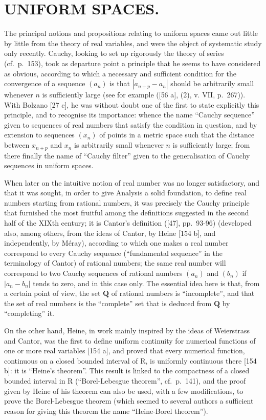 \chapter{UNIFORM SPACES.}

The principal notions and propositions relating to uniform spaces came out little by little from the theory of real variables, and were the object of systematic study only recently. Cauchy, looking to set up rigorously the theory of series (cf.~p.~153), took as departure point a principle that he seems to have considered as obvious, according to which a necessary and sufficient condition for the convergence of a sequence \((a_{n})\) is that \(|a_{n+p} - a_{n}|\) should be arbitrarily small whenever \(n\) is sufficiently large (see for example ({[}56 a{]}, (2), v. VII, p.~267)). With Bolzano {[}27 c{]}, he was without doubt one of the first to state explicitly this principle, and to recognise its importance: whence the name ``Cauchy sequence'' given to sequences of real numbers that satisfy the condition in question, and by extension to sequences \((x_{n})\) of points in a metric space such that the distance between \(x_{n+p}\) and \(x_{n}\) is arbitrarily small whenever \(n\) is sufficiently large; from there finally the name of ``Cauchy filter'' given to the generalisation of Cauchy sequences in uniform spaces.

When later on the intuitive notion of real number was no longer satisfactory, and that it was sought, in order to give Analysis a solid foundation, to define real numbers starting from rational numbers, it was precisely the Cauchy principle that furnished the most fruitful among the definitions suggested in the second half of the XIXth century; it is Cantor's definition ({[}47{]}, pp.~93-96) (developed also, among others, from the ideas of Cantor, by Heine {[}154 b{]}, and independently, by Méray), according to which one makes a real number correspond to every Cauchy sequence (``fundamental sequence'' in the terminology of Cantor) of rational numbers; the same real number will correspond to two Cauchy sequences of rational numbers \((a_{n})\) and \((b_{n})\) if \(|a_{n} - b_{n}|\) tends to zero, and in this case only. The essential idea here is that, from a certain point of view, the set \(\mathbf{Q}\) of rational numbers is ``incomplete'', and that the set of real numbers is the ``complete'' set that is deduced from \(\mathbf{Q}\) by ``completing'' it.

On the other hand, Heine, in work mainly inspired by the ideas of Weierstrass and Cantor, was the first to define uniform continuity for numerical functions of one or more real variables {[}154 a{]}, and proved that every numerical function, continuous on a closed bounded interval of R, is uniformly continuous there {[}154 b{]}: it is ``Heine's theorem''. This result is linked to the compactness of a closed bounded interval in R (``Borel-Lebesgue theorem'', cf.~p.~141), and the proof given by Heine of his theorem can also be used, with a few modifications, to prove the Borel-Lebesgue theorem (which seemed to several authors a sufficient reason for giving this theorem the name ``Heine-Borel theorem'').

